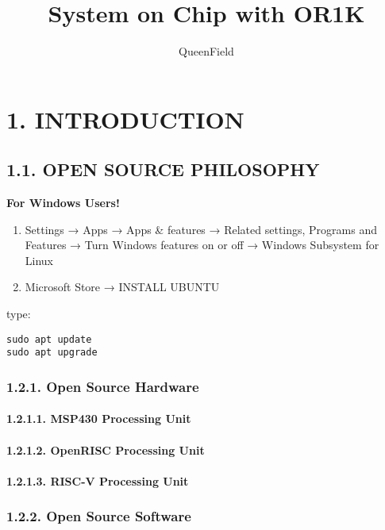 \documentclass[]{article}
\title{System on Chip with OR1K}
\author{QueenField}
\date{}
\let\oldparagraph\paragraph
\renewcommand{\paragraph}[1]{\oldparagraph{#1}\mbox{}}
\begin{document}
\maketitle

\section{1. INTRODUCTION}\label{introduction}

\subsection{1.1. OPEN SOURCE PHILOSOPHY}\label{open-source-philosophy}

\textbf{For Windows Users!}

\begin{enumerate}
\def\labelenumi{\arabic{enumi}.}
\item
  Settings → Apps → Apps \& features → Related settings, Programs and
  Features → Turn Windows features on or off → Windows Subsystem for
  Linux
\item
  Microsoft Store → INSTALL UBUNTU
\end{enumerate}

type:

\begin{verbatim}
sudo apt update
sudo apt upgrade
\end{verbatim}

\subsubsection{1.2.1. Open Source Hardware}\label{open-source-hardware}

\paragraph{1.2.1.1. MSP430 Processing
Unit}\label{msp430-processing-unit}

\paragraph{1.2.1.2. OpenRISC Processing
Unit}\label{openrisc-processing-unit}

\paragraph{1.2.1.3. RISC-V Processing
Unit}\label{risc-v-processing-unit}

\subsubsection{1.2.2. Open Source Software}\label{open-source-software}
\end{document}
